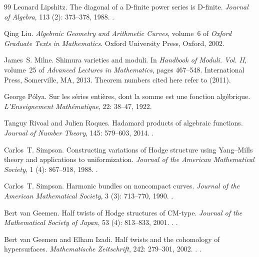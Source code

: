 \documentclass[11pt]{amsart}
\theoremstyle{definition}
\theoremstyle{remark}
\numberwithin{equation}{section}
\begin{document}
\begin{thebibliography}{99}
Leonard Lipshitz.
\newblock The diagonal of a {D}-finite power series is {D}-finite.
\newblock \emph{Journal of Algebra}, 113 (2): 373--378, 1988.
\newblock {}.

Qing Liu.
\newblock \emph{Algebraic Geometry and Arithmetic Curves}, volume~6 of
  \emph{Oxford Graduate Texts in Mathematics}.
\newblock Oxford University Press, Oxford, 2002.

James~S. Milne.
\newblock Shimura varieties and moduli.
\newblock In \emph{Handbook of Moduli. {V}ol. {II}}, volume~25 of
  \emph{Advanced Lectures in Mathematics}, pages 467--548. International Press,
  Somerville, MA, 2013.
\newblock Theorem numbers cited here refer to  (2011).

George P{\'o}lya.
\newblock Sur les s{\'e}ries enti{\`e}res, dont la somme est une fonction
  alg{\'e}brique.
\newblock \emph{L'Enseignement Math{\'e}matique}, 22: 38--47, 1922.

Tanguy Rivoal and Julien Roques.
\newblock Hadamard products of algebraic functions.
\newblock \emph{Journal of Number Theory}, 145: 579--603, 2014.
\newblock {}.

Carlos~T. Simpson.
\newblock Constructing variations of {H}odge structure using {Y}ang--{M}ills
  theory and applications to uniformization.
\newblock \emph{Journal of the American Mathematical Society}, 1
  (4): 867--918, 1988.
\newblock {}.

Carlos~T. Simpson.
\newblock Harmonic bundles on noncompact curves.
\newblock \emph{Journal of the American Mathematical Society}, 3
  (3): 713--770, 1990.
\newblock {}.

Bert van Geemen.
\newblock Half twists of {H}odge structures of {CM}-type.
\newblock \emph{Journal of the Mathematical Society of Japan}, 53
  (4): 813--833, 2001.
\newblock {}.
\newblock {}.

Bert van Geemen and Elham Izadi.
\newblock Half twists and the cohomology of hypersurfaces.
\newblock \emph{Mathematische Zeitschrift}, 242: 279--301, 2002.
\newblock {}.
\newblock {}.


\end{thebibliography}
\end{document}
